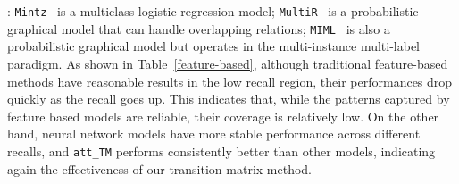 : \texttt{Mintz}~\cite{mintz2009distant} is a multiclass logistic regression model; \texttt{MultiR}~\cite{hoffmann2011knowledge} is a probabilistic graphical model that can handle overlapping relations; \texttt{MIML}~\cite{surdeanu2012multi} is also a probabilistic graphical model but operates in the multi-instance multi-label paradigm. As shown in Table~\ref{feature-based}, although traditional feature-based methods have reasonable results in the low recall region, their performances drop quickly as the recall goes up. This indicates that, while the patterns captured by feature based models are reliable, their coverage is relatively low. On the other hand, neural network models have more stable performance across different recalls, and \texttt{att\_TM} performs consistently better than other models, indicating again the effectiveness of our transition matrix method.






